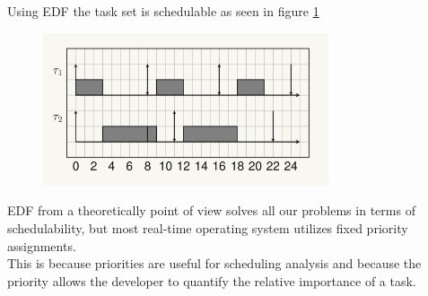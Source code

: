 Using EDF the task set is schedulable as seen in figure \ref{fig:image15}
\begin{figure}[!h]
    \centering
    \includegraphics[width = 0.75\textwidth]{images/image15}
    \caption{}
    \label{fig:image15}
\end{figure}

EDF from a theoretically point of view solves all our problems in terms of schedulability, but most real-time operating system utilizes fixed priority assignments.\\
This is because priorities are useful for scheduling analysis and because the priority allows the developer to quantify the relative importance of a task.
